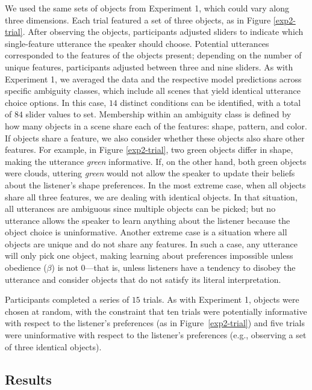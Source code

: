 \documentclass[10pt,a4paper]{article}
\begin{document}
We used the same sets of objects from Experiment 1, which could vary along three dimensions. Each trial featured a set of three objects, as in Figure \ref{exp2-trial}. After observing the objects, participants adjusted sliders to indicate which single-feature utterance the speaker should choose. Potential utterances corresponded to the features of the objects present; depending on the number of unique features, participants adjusted between three and nine sliders. As with Experiment 1, we averaged the data and the respective model predictions across specific ambiguity classes, which include all scenes that yield identical utterance choice options. 
In this case, $14$ distinct conditions can be identified, with a total of $84$ slider values to set. 
Membership within an ambiguity class is defined by how many objects in a scene share each of the features: shape, pattern, and color. If objects share a feature, we also consider whether these objects also share other features. For example, in Figure \ref{exp2-trial}, two green objects differ in shape, making the utterance \textit{green} informative. If, on the other hand, both green objects were clouds, uttering \textit{green} would not allow the speaker to update their beliefs about the listener's shape preferences.
In the most extreme case, when all objects share all three features, we are dealing with identical objects. In that situation, all utterances are ambiguous since multiple objects can be picked; but no utterance allows the speaker to learn anything about the listener because the object choice is uninformative. Another extreme case is a situation where all objects are unique and do not share any features. In such a case, any utterance will only pick one object, making learning about preferences impossible unless obedience ($\beta$) is not 0---that is, unless listeners have a tendency to disobey the utterance and consider objects that do not satisfy its literal interpretation.

Participants completed a series of $15$ trials. As with Experiment 1, objects were chosen at random, with the constraint that ten trials were potentially informative with respect to the listener's preferences (as in Figure~\ref{exp2-trial}) and five trials were uninformative with respect to the listener's preferences (e.g., observing a set of three identical objects).



\subsection{Results}
\end{document}
